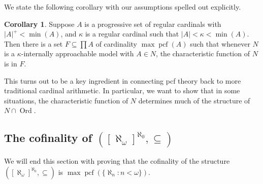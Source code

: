 \documentclass[10pt]{amsart}
\theoremstyle{plain}
\theoremstyle{definition}
\newtheorem{corollary}[proposition]{Corollary}
\theoremstyle{remark}
\DeclareMathOperator{\pcf}{pcf}
\DeclareMathOperator{\ord}{Ord}
\numberwithin{equation}{section}
\begin{document}
We state the following corollary with our assumptions spelled out explicitly.

\begin{corollary}
\label{cor:CaptureChar}
 Suppose $A$ is a progressive set of regular cardinals with $|A|^+<\min(A)$, and $\kappa$ is a regular cardinal
such that $|A|<\kappa<\min(A)$. Then there is a set $F\subseteq\prod A$ of cardinality $\max\pcf(A)$ such that whenever $N$ is a
$\kappa$-internally approachable model with $A\in N$, the characteristic function of $N$ is in $F$.
\end{corollary}

This turns out to be a key ingredient in connecting pcf theory back to more traditional cardinal arithmetic.  In particular,
we want to show that in some situations, the characteristic function of $N$ determines much of the structure of $N\cap\ord$.

\subsection{The cofinality of $([\aleph_\omega]^{\aleph_0},\subseteq)$}

We will end this section with proving that the cofinality of the structure $\left([\aleph_\omega]^{\aleph_0},\subseteq\right)$
is $\max\pcf(\{\aleph_n:n<\omega\})$.
\end{document}
